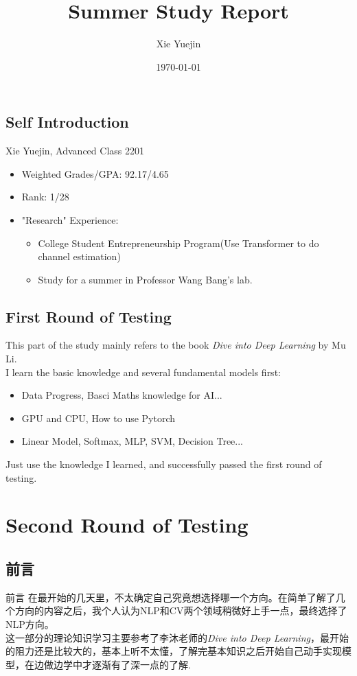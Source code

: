 \documentclass[UTF8]{ctexbeamer}
\title{Summer Study Report}
\author[Xie Yuejin(Advanced Class 2201)]{Xie Yuejin}
\institute[*]{Advanced Class 2201\\
	Huazhong University of Science and Technology\\
	u202210333@hust.edu.cn}
\date{\today}
\begin{document}
\begin{frame}
    \titlepage
\end{frame}

\begin{frame}
	\tableofcontents
\end{frame}

\begin{frame}
\section{Self Introduction}
Xie Yuejin, Advanced Class 2201
\begin{itemize}
	\item Weighted Grades/GPA: 92.17/4.65
	\item Rank: 1/28
	\item "Research" Experience: 
	\begin{itemize}
		\item College Student Entrepreneurship Program(Use Transformer to do channel estimation)
		\item Study for a summer in Professor Wang Bang's lab.
	\end{itemize}
\end{itemize}
\end{frame}

\begin{frame}
\section{First Round of Testing}
This part of the study mainly refers to the book \emph{Dive into Deep Learning} by Mu Li.\\
I learn the basic knowledge and several fundamental models first:
\begin{itemize}
	\item Data Progress, Basci Maths knowledge for AI...
	\item GPU and CPU, How to use Pytorch
	\item Linear Model, Softmax, MLP, SVM, Decision Tree...
\end{itemize}
Just use the knowledge I learned, and successfully passed the first round of testing.
\end{frame}
\section{Second Round of Testing \uppercase\expandafter{}}
\subsection{前言}
\begin{frame}{前言}	
在最开始的几天里，不太确定自己究竟想选择哪一个方向。在简单了解了几个方向的内容之后，我个人认为NLP和CV两个领域稍微好上手一点，最终选择了NLP方向。\\
这一部分的理论知识学习主要参考了李沐老师的\emph{Dive into Deep Learning}，最开始的阻力还是比较大的，基本上听不太懂，了解完基本知识之后开始自己动手实现模型，在边做边学中才逐渐有了深一点的了解.\\
\end{frame}
\end{document}
